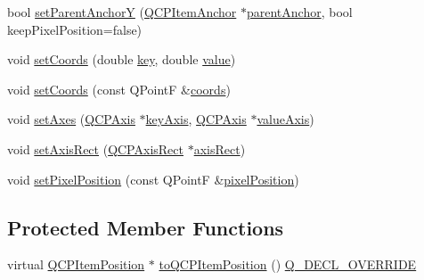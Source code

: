 \begin{DoxyCompactItemize}
bool \mbox{\hyperlink{class_q_c_p_item_position_add5ec1db9d19cec58a3b5c9e0a0c3f9d}{set\+Parent\+AnchorY}} (\mbox{\hyperlink{class_q_c_p_item_anchor}{Q\+C\+P\+Item\+Anchor}} $\ast$\mbox{\hyperlink{class_q_c_p_item_position_a0a87f9dce1af6cc9b510785991bcf1c6}{parent\+Anchor}}, bool keep\+Pixel\+Position=false)
\item 
void \mbox{\hyperlink{class_q_c_p_item_position_aa988ba4e87ab684c9021017dcaba945f}{set\+Coords}} (double \mbox{\hyperlink{class_q_c_p_item_position_a6fc519f1b73722a8d0cff7d4d647407e}{key}}, double \mbox{\hyperlink{diffusion_8cpp_a4b41795815d9f3d03abfc739e666d5da}{value}})
\item 
void \mbox{\hyperlink{class_q_c_p_item_position_acc70b3abc143287f806e5f154e5e07b0}{set\+Coords}} (const Q\+PointF \&\mbox{\hyperlink{class_q_c_p_item_position_aa4ecf5b04c67049c05d37619e090820b}{coords}})
\item 
void \mbox{\hyperlink{class_q_c_p_item_position_a2185f45c75ac8cb9be89daeaaad50e37}{set\+Axes}} (\mbox{\hyperlink{class_q_c_p_axis}{Q\+C\+P\+Axis}} $\ast$\mbox{\hyperlink{class_q_c_p_item_position_a9ad34861fbfd8be8b8270c16f879169c}{key\+Axis}}, \mbox{\hyperlink{class_q_c_p_axis}{Q\+C\+P\+Axis}} $\ast$\mbox{\hyperlink{class_q_c_p_item_position_a356ac94e7e73d88deb7f2841c0d0c734}{value\+Axis}})
\item 
void \mbox{\hyperlink{class_q_c_p_item_position_a0cd9b326fb324710169e92e8ca0041c2}{set\+Axis\+Rect}} (\mbox{\hyperlink{class_q_c_p_axis_rect}{Q\+C\+P\+Axis\+Rect}} $\ast$\mbox{\hyperlink{class_q_c_p_item_position_ae4081cfe7575f922f403c6e3a2ce7891}{axis\+Rect}})
\item 
void \mbox{\hyperlink{class_q_c_p_item_position_a8d4f858f2089973967cf9cb81970ef0a}{set\+Pixel\+Position}} (const Q\+PointF \&\mbox{\hyperlink{class_q_c_p_item_position_a8be9a4787635433edecc75164beb748d}{pixel\+Position}})
\end{DoxyCompactItemize}
\subsection*{Protected Member Functions}
\begin{DoxyCompactItemize}
\item 
virtual \mbox{\hyperlink{class_q_c_p_item_position}{Q\+C\+P\+Item\+Position}} $\ast$ \mbox{\hyperlink{class_q_c_p_item_position_a008ff9ebe645a963671b68bcf7f7a1c0}{to\+Q\+C\+P\+Item\+Position}} () \mbox{\hyperlink{qcustomplot_8h_a42cc5eaeb25b85f8b52d2a4b94c56f55}{Q\+\_\+\+D\+E\+C\+L\+\_\+\+O\+V\+E\+R\+R\+I\+DE}}
\end{DoxyCompactItemize}

